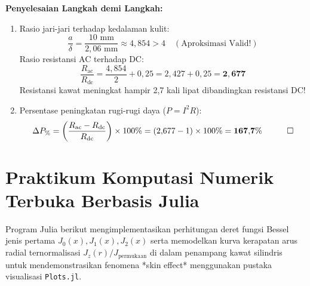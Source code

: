 \documentclass[11pt,a4paper]{article}
\theoremstyle{definition}
\begin{document}
\noindent\textbf{Penyelesaian Langkah demi Langkah:}
\begin{enumerate}[leftmargin=*]
    \item Rasio jari-jari terhadap kedalaman kulit:
    \begin{equation*}
        \frac{a}{\delta} = \frac{10\text{ mm}}{2{,}06\text{ mm}} \approx 4{,}854 > 4 \quad (\text{Aproksimasi Valid!})
    \end{equation*}
    Rasio resistansi AC terhadap DC:
    \begin{equation*}
        \frac{R_{\text{ac}}}{R_{\text{dc}}} = \frac{4{,}854}{2} + 0{,}25 = 2{,}427 + 0{,}25 = \mathbf{2{,}677}
    \end{equation*}
    Resistansi kawat meningkat hampir 2,7 kali lipat dibandingkan resistansi DC!
    
    \item Persentase peningkatan rugi-rugi daya ($P = I^2 R$):
    \begin{equation*}
        \Delta P_{\%} = \left( \frac{R_{\text{ac}} - R_{\text{dc}}}{R_{\text{dc}}} \right) \times 100\% = (2{,}677 - 1) \times 100\% = \mathbf{167{,}7\%} \quad \qed
    \end{equation*}
\end{enumerate}

\section{Praktikum Komputasi Numerik Terbuka Berbasis Julia}

Program Julia berikut mengimplementasikan perhitungan deret fungsi Bessel jenis pertama $J_0(x), J_1(x), J_2(x)$ serta memodelkan kurva kerapatan arus radial ternormalisasi $J_z(r)/J_{\text{permukaan}}$ di dalam penampang kawat silindris untuk mendemonstrasikan fenomena *skin effect* menggunakan pustaka visualisasi \texttt{Plots.jl}.
\end{document}
